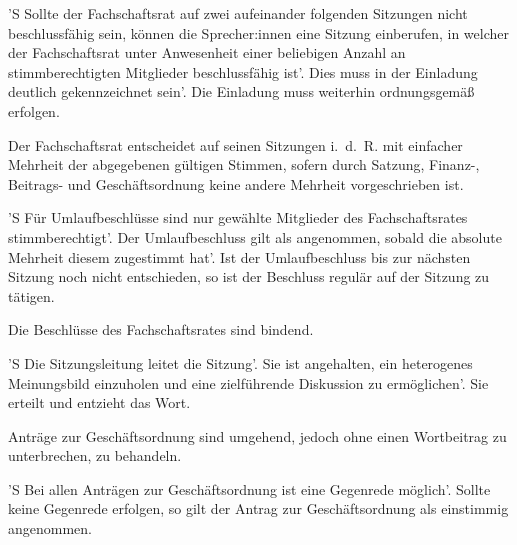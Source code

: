 \documentclass[%
    parskip=half,
]{scrartcl}
\begin{document}
\begin{contract}
'S Sollte der Fachschaftsrat auf zwei aufeinander folgenden Sitzungen nicht beschlussfähig sein, können die Sprecher:innen eine Sitzung einberufen, in welcher der Fachschaftsrat unter Anwesenheit einer beliebigen Anzahl an stimmberechtigten Mitglieder beschlussfähig ist'.
Dies muss in der Einladung deutlich gekennzeichnet sein'.
Die Einladung muss weiterhin ordnungsgemäß erfolgen.

Der Fachschaftsrat entscheidet auf seinen Sitzungen i.~d.~R. mit einfacher Mehrheit der abgegebenen gültigen Stimmen, sofern durch Satzung, Finanz-, Beitrags- und Geschäftsordnung keine andere Mehrheit vorgeschrieben ist.

'S Für Umlaufbeschlüsse sind nur gewählte Mitglieder des Fachschaftsrates stimmberechtigt'.
Der Umlaufbeschluss gilt als angenommen, sobald die absolute Mehrheit diesem zugestimmt hat'.
Ist der Umlaufbeschluss bis zur nächsten Sitzung noch nicht entschieden, so ist der Beschluss regulär auf der Sitzung zu tätigen.

Die Beschlüsse des Fachschaftsrates sind bindend.


'S Die Sitzungsleitung leitet die Sitzung'.
Sie ist angehalten, ein heterogenes Meinungsbild einzuholen und eine zielführende Diskussion zu ermöglichen'.
Sie erteilt und entzieht das Wort.


Anträge zur Geschäftsordnung sind umgehend, jedoch ohne einen Wortbeitrag zu unterbrechen, zu behandeln.

'S Bei allen Anträgen zur Geschäftsordnung ist eine Gegenrede möglich'.
Sollte keine Gegenrede erfolgen, so gilt der Antrag zur Geschäftsordnung als einstimmig angenommen.


\end{contract}
\end{document}
